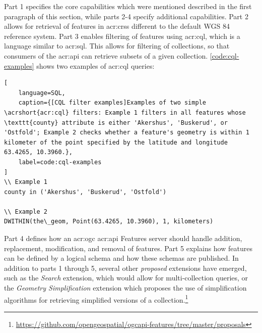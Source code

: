 Part 1 specifies the core capabilities which were mentioned described in the first paragraph of this section, while parts 2-4 specify additional capabilities. Part 2 allows for retrieval of features in \glspl{acr:crs} different to the default WGS 84 reference system. Part 3 enables filtering of features using \gls{acr:cql}, which is a language similar to \acrshort{acr:sql}. This allows for filtering of collections, so that consumers of the \acrshort{acr:api} can retrieve subsets of a given collection. \autoref{code:cql-examples} shows two examples of \gls{acr:cql} queries:

\begin{lstlisting}[
    language=SQL,
    caption={[CQL filter examples]Examples of two simple \acrshort{acr:cql} filters: Example 1 filters in all features whose \texttt{county} attribute is either 'Akershus', 'Buskerud', or 'Ostfold'; Example 2 checks whether a feature's geometry is within 1 kilometer of the point specified by the latitude and longitude 63.4265, 10.3960.},
    label=code:cql-examples
]
\\ Example 1
county in ('Akershus', 'Buskerud', 'Ostfold')

\\ Example 2
DWITHIN(the\_geom, Point(63.4265, 10.3960), 1, kilometers)
\end{lstlisting}

Part 4 defines how an \acrshort{acr:ogc} \acrshort{acr:api} Features server should handle addition, replacement, modification, and removal of features. Part 5 explains how features can be defined by a logical schema and how these schemas are published. In addition to parts 1 through 5, several other \textit{proposed} extensions have emerged, such as the \textit{Search} extension, which would allow for multi-collection queries, or the \textit{Geometry Simplification} extension which proposes the use of simplification algorithms for retrieving simplified versions of a collection.\footnote{\url{https://github.com/opengeospatial/ogcapi-features/tree/master/proposals}}





